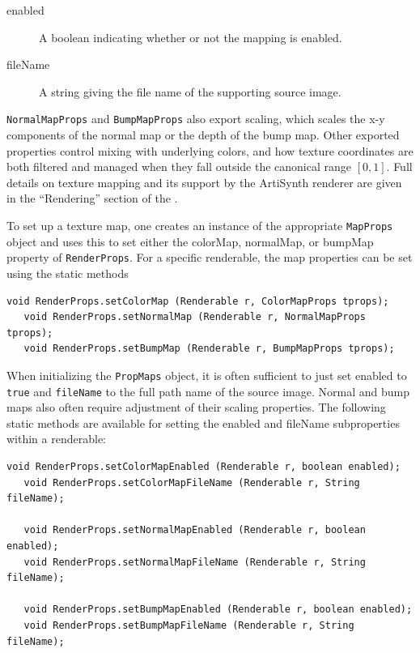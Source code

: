 \begin{description}

\item[enabled]\mbox{}

A boolean indicating whether or not the mapping is enabled.

\item[fileName]\mbox{}

A string giving the file name of the supporting source image.

\end{description}

{\tt NormalMapProps} and {\tt BumpMapProps} also export {\sf scaling},
which scales the x-y components of the normal map or the depth of the
bump map. Other exported properties control mixing with underlying
colors, and how texture coordinates are both filtered and managed when
they fall outside the canonical range $[0,1]$.  Full details on
texture mapping and its support by the ArtiSynth renderer are given in
the ``Rendering'' section of the 
.

To set up a texture map, one creates an instance of the appropriate
{\tt MapProps} object and uses this to set either the {\sf colorMap},
{\sf normalMap}, or {\sf bumpMap} property of {\tt RenderProps}.  
For a specific renderable, the map properties can be set
using the static methods
\begin{lstlisting}[]
   void RenderProps.setColorMap (Renderable r, ColorMapProps tprops);
   void RenderProps.setNormalMap (Renderable r, NormalMapProps tprops);
   void RenderProps.setBumpMap (Renderable r, BumpMapProps tprops);
\end{lstlisting}
%
When
initializing the {\tt PropMaps} object, it is often sufficient to just
set {\sf enabled} to {\tt true} and {\tt fileName} to the full path
name of the source image.  Normal and bump maps also often require
adjustment of their {\sf scaling} properties.  The following static
methods are available for setting the {\sf enabled} and
{\sf fileName} subproperties within a renderable:
\begin{lstlisting}[]
   void RenderProps.setColorMapEnabled (Renderable r, boolean enabled);
   void RenderProps.setColorMapFileName (Renderable r, String fileName);

   void RenderProps.setNormalMapEnabled (Renderable r, boolean enabled);
   void RenderProps.setNormalMapFileName (Renderable r, String fileName);

   void RenderProps.setBumpMapEnabled (Renderable r, boolean enabled);
   void RenderProps.setBumpMapFileName (Renderable r, String fileName);
\end{lstlisting}
%


